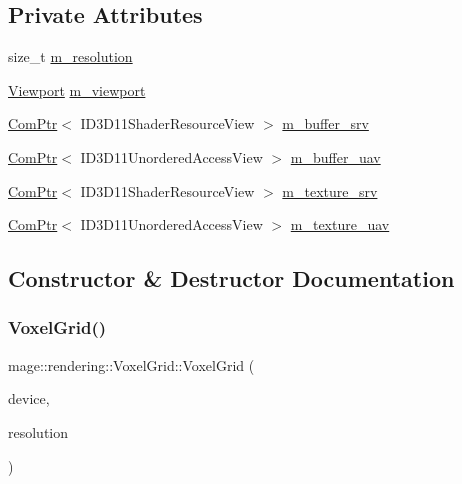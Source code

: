 \subsection*{Private Attributes}
\begin{DoxyCompactItemize}
\item 
size\+\_\+t \mbox{\hyperlink{classmage_1_1rendering_1_1_voxel_grid_a6f297da985b384ac6785383fd296c230}{m\+\_\+resolution}}
\item 
\mbox{\hyperlink{classmage_1_1rendering_1_1_viewport}{Viewport}} \mbox{\hyperlink{classmage_1_1rendering_1_1_voxel_grid_a02dca68f610cdb271b8895a9377af020}{m\+\_\+viewport}}
\item 
\mbox{\hyperlink{namespacemage_ae74f374780900893caa5555d1031fd79}{Com\+Ptr}}$<$ I\+D3\+D11\+Shader\+Resource\+View $>$ \mbox{\hyperlink{classmage_1_1rendering_1_1_voxel_grid_ab0d154365336f1b8a9a0921cb4ade6a2}{m\+\_\+buffer\+\_\+srv}}
\item 
\mbox{\hyperlink{namespacemage_ae74f374780900893caa5555d1031fd79}{Com\+Ptr}}$<$ I\+D3\+D11\+Unordered\+Access\+View $>$ \mbox{\hyperlink{classmage_1_1rendering_1_1_voxel_grid_a749d37651a7aebb6ab775424508ea92d}{m\+\_\+buffer\+\_\+uav}}
\item 
\mbox{\hyperlink{namespacemage_ae74f374780900893caa5555d1031fd79}{Com\+Ptr}}$<$ I\+D3\+D11\+Shader\+Resource\+View $>$ \mbox{\hyperlink{classmage_1_1rendering_1_1_voxel_grid_a81624e2bc21c444527156637c0415108}{m\+\_\+texture\+\_\+srv}}
\item 
\mbox{\hyperlink{namespacemage_ae74f374780900893caa5555d1031fd79}{Com\+Ptr}}$<$ I\+D3\+D11\+Unordered\+Access\+View $>$ \mbox{\hyperlink{classmage_1_1rendering_1_1_voxel_grid_a768675d9df84ea0283ba108c682df187}{m\+\_\+texture\+\_\+uav}}
\end{DoxyCompactItemize}


\subsection{Constructor \& Destructor Documentation}
\mbox{\label{classmage_1_1rendering_1_1_voxel_grid_aec475857836dbf56d99f30a9d8f70272}} 
\subsubsection{\texorpdfstring{Voxel\+Grid()}{VoxelGrid()}\hspace{0.1cm}{\footnotesize\ttfamily [1/3]}}
{\footnotesize\ttfamily mage\+::rendering\+::\+Voxel\+Grid\+::\+Voxel\+Grid (\begin{DoxyParamCaption}\item[{I\+D3\+D11\+Device \&}]{device,  }\item[{size\+\_\+t}]{resolution }\end{DoxyParamCaption})\hspace{0.3cm}{\ttfamily [explicit]}}

